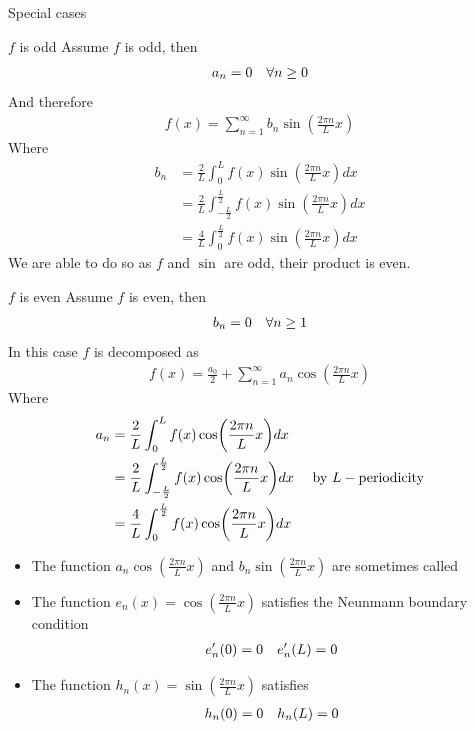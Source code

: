\begin{parag}{Special cases}
	\begin{subparag}{$f$ is odd}
    Assume $f$ is odd, then 
	\begin{align*} 
		a_n = 0 \quad \forall n \geq 0 
	\end{align*}
	And therefore 
	\begin{align*} 
		f\left(x\right) = \sum_{n= 1}^{\infty}b_n \sin\left(\frac{2\pi n}{L}x\right)
	\end{align*}
	Where 
	\begin{align*} 
		b_n &= \frac{2}{L}\int_0^{L}f\left(x\right) \sin\left(\frac{2\pi n}{L}x\right)dx\\
			&=  \frac{2}{L} \int_{-\frac{L}{2}}^{\frac{L}{2}}f\left(x\right) \sin\left(\frac{2\pi n}{L}x\right)dx\\
			&= \frac{4}{L}\int_0^{\frac{L}{2}}f\left(x\right)\sin\left(\frac{2\pi n}{L}x\right)dx
	\end{align*}
	We are able to do so as $f$ and $\sin$ are odd, their product is even.
	\end{subparag}
	\begin{subparag}{$f$ is even}
	    Assume $f$ is even, then 
		\begin{align*} b_n = 0 \quad \forall n\geq 1 \end{align*}
		In this case $f$ is decomposed as
		\begin{align*} 
			f\left(x\right) = \frac{a_0}{2} + \sum_{n = 1}^{\infty}a_n \cos\left(\frac{2\pi n}{L}x\right)
		\end{align*}
		Where 
		\begin{align*} 
			a_n &= \frac{2}{L}\int_0^{L}f\left(x\right)\cos\left(\frac{2\pi n}{L}x\right)dx\\
				&= \frac{2}{L}\int_{-\frac{L}{2}}^{\frac{L}{2}}f\left(x\right)\cos\left(\frac{ 2\pi n}{L}x\right)dx \mathspace \text{ by } L-\text{periodicity}\\
				&= \frac{4}{L}\int_{0}^{\frac{L}{2}}f\left(x\right)\cos\left(\frac{2\pi n}{L}x\right)dx
		\end{align*}
	\end{subparag}
	\begin{framedremark}
		\begin{itemize}
			\item The function $a_n \cos\left(\frac{2\pi n}{L}x\right)$ and $b_n \sin\left(\frac{2\pi n}{L}x\right)$ are sometimes called 
			\item The function $e_n\left(x\right) = \cos\left(\frac{2\pi n}{L}x\right)$ satisfies the Neunmann boundary condition 
				\begin{align*} 
					e_n'\left(0\right)= 0 \mathspace e_n'\left(L\right)= 0
				\end{align*}
			\item The function $h_n\left(x\right) =  \sin\left(\frac{2\pi n}{L}x\right)$ satisfies  
				\begin{align*} 
					h_n\left(0\right) = 0 \mathspace h_n\left(L\right) = 0
				\end{align*}
		\end{itemize}
		

\end{framedremark}
\end{parag}
